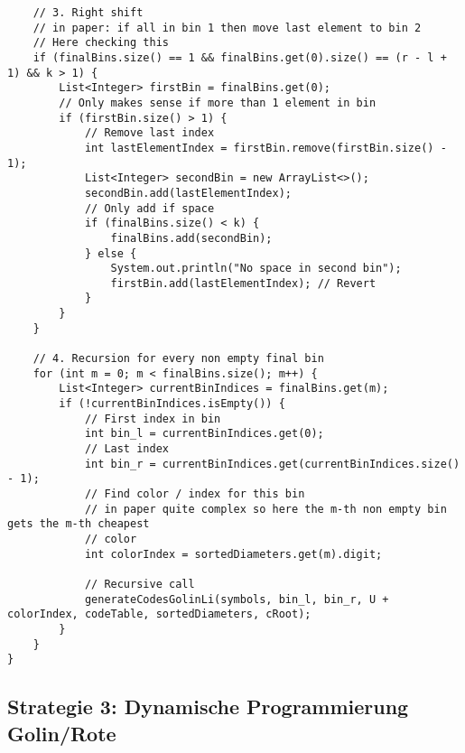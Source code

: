 \documentclass[a4paper,10pt,ngerman]{scrartcl}
\begin{document}
\begin{lstlisting}
    // 3. Right shift
    // in paper: if all in bin 1 then move last element to bin 2
    // Here checking this
    if (finalBins.size() == 1 && finalBins.get(0).size() == (r - l + 1) && k > 1) {
        List<Integer> firstBin = finalBins.get(0);
        // Only makes sense if more than 1 element in bin
        if (firstBin.size() > 1) {
            // Remove last index
            int lastElementIndex = firstBin.remove(firstBin.size() - 1);
            List<Integer> secondBin = new ArrayList<>();
            secondBin.add(lastElementIndex);
            // Only add if space
            if (finalBins.size() < k) {
                finalBins.add(secondBin);
            } else {
                System.out.println("No space in second bin");
                firstBin.add(lastElementIndex); // Revert
            }
        }
    }

    // 4. Recursion for every non empty final bin
    for (int m = 0; m < finalBins.size(); m++) {
        List<Integer> currentBinIndices = finalBins.get(m);
        if (!currentBinIndices.isEmpty()) {
            // First index in bin
            int bin_l = currentBinIndices.get(0);
            // Last index
            int bin_r = currentBinIndices.get(currentBinIndices.size() - 1);
            // Find color / index for this bin
            // in paper quite complex so here the m-th non empty bin gets the m-th cheapest
            // color
            int colorIndex = sortedDiameters.get(m).digit;

            // Recursive call
            generateCodesGolinLi(symbols, bin_l, bin_r, U + colorIndex, codeTable, sortedDiameters, cRoot);
        }
    }
}
\end{lstlisting}

\subsection{Strategie 3: Dynamische Programmierung Golin/Rote}
\end{document}

